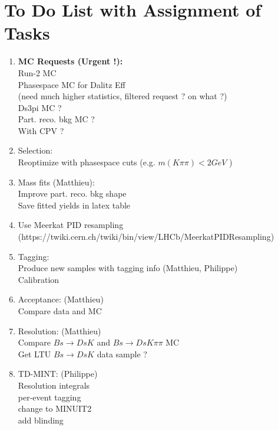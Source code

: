 
\setcounter{section}{-1}
\clearpage

\section{To Do List with Assignment of Tasks}

\begin{enumerate}
	\item \textbf{MC Requests (Urgent !):}
	\\ Run-2 MC 
	\\ Phasespace MC for Dalitz Eff  \\(need much higher statistics, filtered request ? on what ?)
	\\ Ds\to3pi MC ?
	\\ Part. reco. bkg MC ?
	\\ With CPV ?
	\item Selection:
	\\ Reoptimize with phasespace cuts (e.g. $m(K\pi\pi) < 2 GeV$  )  {\Large\color{darkgreen}\checkmark} 
	\item Mass fits (Matthieu):
	\\ Improve part. reco. bkg shape 
	\\ Save fitted yields in latex table
	\item Use Meerkat PID resampling   {\Large\color{darkgreen}\checkmark} 
	\\ (https://twiki.cern.ch/twiki/bin/view/LHCb/MeerkatPIDResampling) 
	\item Tagging:
	\\ Produce new samples with tagging info (Matthieu, Philippe)   {\Large\color{darkgreen}\checkmark} 
	\\ Calibration 
	\item Acceptance: (Matthieu) 
	\\ Compare data and MC 
	\item Resolution: (Matthieu) 
	\\ Compare $Bs\to Ds K$ and $Bs\to Ds K \pi \pi$ MC
	\\ Get LTU $Bs\to Ds K$ data sample ?
	\item TD-MINT: (Philippe)  
	\\ Resolution integrals  {\Large\color{darkgreen}\checkmark} 
	\\ per-event tagging
	\\ change to MINUIT2
	\\ add blinding 
\end{enumerate}





\clearpage

